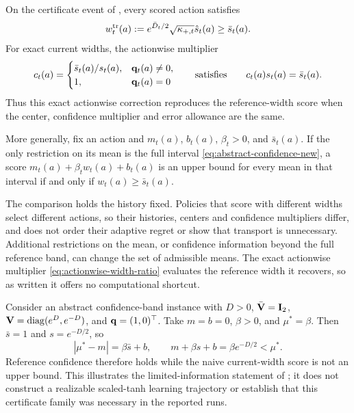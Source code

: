 \begin{proposition}
\label{prop:reference-width-floor}
On the certificate event of , every scored action
satisfies
\begin{equation}\label{eq:reference-width-floor}
 w_t^{\rm tr}(a):=e^{\bar D_t/2}\sqrt{\kappa_{+,t}}\hat s_t(a)
 \ge \bar s_t(a).
\end{equation}
For exact current widths, the actionwise multiplier
\begin{equation}\label{eq:actionwise-width-ratio}
 c_t(a)=\begin{cases}
 \bar s_t(a)/s_t(a),&\mathbf{q}_t(a)\ne0,\\
 1,&\mathbf{q}_t(a)=0
 \end{cases}
 \qquad\text{satisfies}\qquad c_t(a)s_t(a)=\bar s_t(a).
\end{equation}
Thus this exact actionwise correction reproduces the reference-width score when
the center, confidence multiplier and error allowance are the same.

More generally, fix an action and $m_t(a)$, $b_t(a)$, $\beta_t>0$, and
$\bar s_t(a)$.  If the only restriction on its mean is the full interval
\eqref{eq:abstract-confidence-new}, a score
$m_t(a)+\beta_t w_t(a)+b_t(a)$ is an upper bound for every mean in that
interval if and only if $w_t(a)\ge\bar s_t(a)$.
\end{proposition}

The comparison holds the history fixed. Policies that score with different
widths select different actions, so their histories, centers and confidence
multipliers differ, and  does not order their
adaptive regret or show that transport is unnecessary. Additional restrictions
on the mean, or confidence information beyond the full reference band, can
change the set of admissible means. The exact actionwise multiplier
\eqref{eq:actionwise-width-ratio} evaluates the reference width it recovers,
so as written it offers no computational shortcut.

\begin{remark}
\label{rem:naive-width-band-counterexample}
Consider an abstract confidence-band instance with $D>0$,
$\bar{\mathbf{V}}=\mathbf{I}_2$, $\mathbf{V}=\operatorname{diag}(e^D,e^{-D})$, and
$\mathbf{q}=(1,0)^\top$.  Take $m=b=0$, $\beta>0$, and $\mu^*=\beta$.
Then $\bar s=1$ and $s=e^{-D/2}$, so
\[
 |\mu^*-m|=\beta\bar s+b,\qquad
 m+\beta s+b=\beta e^{-D/2}<\mu^*.
\]
Reference confidence therefore holds while the naive current-width score is
not an upper bound.  This illustrates the limited-information statement of
; it does not construct a realizable
scaled-tanh learning trajectory or establish that this certificate family was
necessary in the reported runs.
\end{remark}

